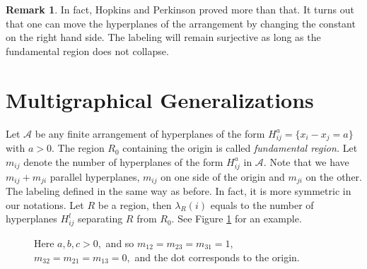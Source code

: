 \documentclass[12pt]{amsart}
\theoremstyle{definition}
\newtheorem{remark}{Remark}
\begin{document}
\begin{remark}
In fact, Hopkins and Perkinson proved more than that. It turns out that one can move the hyperplanes of the arrangement by changing the constant on the right hand side. The labeling will remain surjective as long as the fundamental region does not collapse.
\end{remark}

\section{Multigraphical Generalizations}\label{Section: Multigraph}

Let ${\mathcal A}$ be any finite arrangement of hyperplanes of the form $H_{ij}^a=\{x_i-x_j=a\}$ with $a>0.$
The region $R_0$ containing the origin is called {\it fundamental region.} Let $m_{ij}$ denote the number of hyperplanes of the form $H_{ij}^a$ in ${\mathcal A}.$ Note that we have $m_{ij}+m_{ji}$ parallel hyperplanes, $m_{ij}$ on one side of the origin and $m_{ji}$ on the other. The labeling defined in the same way as before. In fact, it is more symmetric in our notations. Let $R$ be a region, then $\lambda_R(i)$ equals to the number of hyperplanes $H_{ij}^l$ separating $R$ from $R_0.$ See Figure \ref{Figure: MGPS labeling} for an example.

\begin{figure}
\begin{center}
\end{center}
\caption{Here $a,b,c>0,$ and so $m_{12}=m_{23}=m_{31}=1,$\ $m_{32}=m_{21}=m_{13}=0,$ and the dot corresponds to the origin.}\label{Figure: MGPS labeling}
\end{figure}
\end{document}
